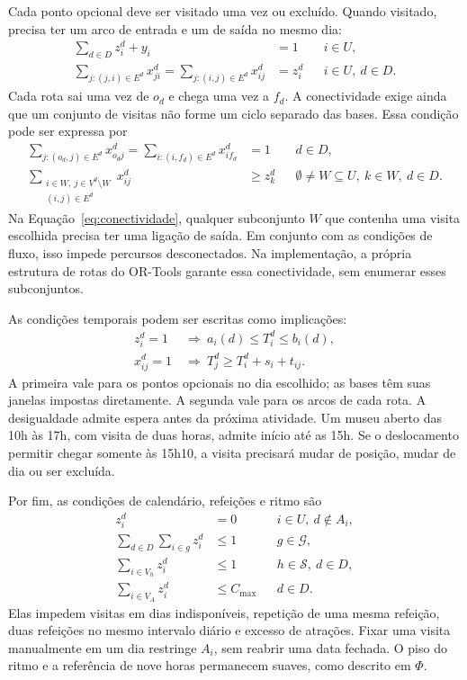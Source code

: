 Cada ponto opcional deve ser visitado uma vez ou excluído. Quando visitado, precisa ter um arco de entrada e um de saída no mesmo dia:
\begin{align}
\sum_{d\in D}z_i^d+y_i&=1 && i\in U,\label{eq:visita-unica}\\
\sum_{j:(j,i)\in E^d}x_{ji}^d
=\sum_{j:(i,j)\in E^d}x_{ij}^d&=z_i^d && i\in U,\ d\in D.\label{eq:fluxo-visitas}
\end{align}
Cada rota sai uma vez de $o_d$ e chega uma vez a $f_d$. A conectividade exige ainda que um conjunto de visitas não forme um ciclo separado das bases. Essa condição pode ser expressa por
\begin{align}
\sum_{j:(o_d,j)\in E^d}x_{o_dj}^d
=\sum_{i:(i,f_d)\in E^d}x_{if_d}^d&=1 && d\in D,\label{eq:bases-rota}\\
\sum_{\substack{i\in W,\ j\in V^d\setminus W\\(i,j)\in E^d}}x_{ij}^d
&\geq z_k^d && \emptyset\ne W\subseteq U,\ k\in W,\ d\in D.\label{eq:conectividade}
\end{align}
Na Equação~\ref{eq:conectividade}, qualquer subconjunto $W$ que contenha uma visita escolhida precisa ter uma ligação de saída. Em conjunto com as condições de fluxo, isso impede percursos desconectados. Na implementação, a própria estrutura de rotas do OR-Tools garante essa conectividade, sem enumerar esses subconjuntos.

As condições temporais podem ser escritas como implicações:
\begin{align}
z_i^d=1&\ \Longrightarrow\ a_i(d)\leq T_i^d\leq b_i(d),\label{eq:janela-visita}\\
x_{ij}^d=1&\ \Longrightarrow\ T_j^d\geq T_i^d+s_i+t_{ij}.\label{eq:tempo-rota}
\end{align}
A primeira vale para os pontos opcionais no dia escolhido; as bases têm suas janelas impostas diretamente. A segunda vale para os arcos de cada rota. A desigualdade admite espera antes da próxima atividade. Um museu aberto das 10h às 17h, com visita de duas horas, admite início até as 15h. Se o deslocamento permitir chegar somente às 15h10, a visita precisará mudar de posição, mudar de dia ou ser excluída.

Por fim, as condições de calendário, refeições e ritmo são
\begin{align}
z_i^d&=0 && i\in U,\ d\notin A_i,\\
\sum_{d\in D}\sum_{i\in g}z_i^d&\leq1 && g\in\mathcal{G},\\
\sum_{i\in V_h}z_i^d&\leq1 && h\in\mathcal{S},\ d\in D,\\
\sum_{i\in V_A}z_i^d&\leq C_{\max} && d\in D.
\end{align}
Elas impedem visitas em dias indisponíveis, repetição de uma mesma refeição, duas refeições no mesmo intervalo diário e excesso de atrações. Fixar uma visita manualmente em um dia restringe $A_i$, sem reabrir uma data fechada. O piso do ritmo e a referência de nove horas permanecem suaves, como descrito em $\Phi$.

